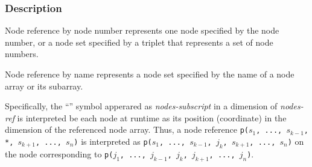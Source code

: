 
\subsubsection*{Description}

Node reference by node number represents one node specified by the node 
number, or a node set specified by a triplet that represents a set of
node numbers.

Node reference by name represents a node set specified by the name of a
node array or its subarray.


Specifically, the ``{\tt *}'' symbol apperared as {\it nodes-subscript}
in a dimension of {\it nodes-ref} is interpreted be each node at runtime
as its position (coordinate) in the dimension of the referenced node
array.
%
Thus, a node reference {\tt p($s_1$, ..., $s_{k-1}$, *, $s_{k+1}$, ...,
$s_n$)} is interpreted as {\tt p($s_1$, ..., $s_{k-1}$, $j_k$,
$s_{k+1}$, ..., $s_n$)} on the node corresponding to {\tt p($j_1$, ...,
$j_{k-1}$, $j_k$, $j_{k+1}$, ..., $j_n$)}.

%

